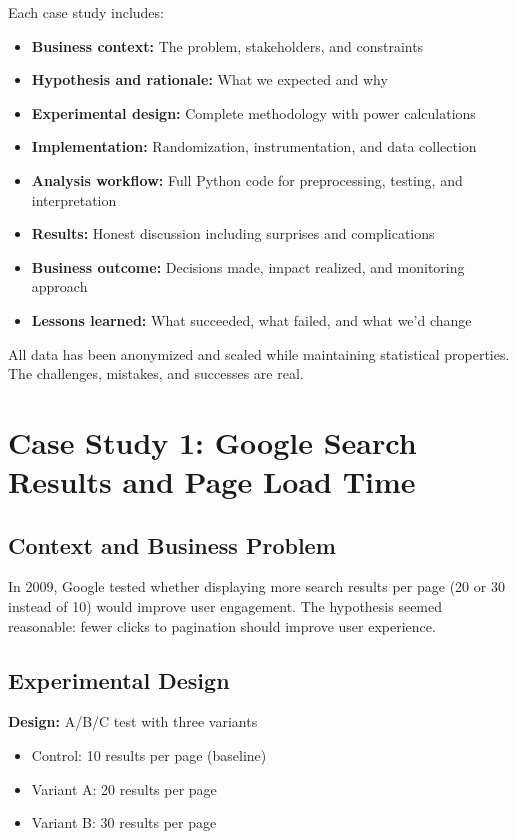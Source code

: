 Each case study includes:
\begin{itemize}
    \item \textbf{Business context:} The problem, stakeholders, and constraints
    \item \textbf{Hypothesis and rationale:} What we expected and why
    \item \textbf{Experimental design:} Complete methodology with power calculations
    \item \textbf{Implementation:} Randomization, instrumentation, and data collection
    \item \textbf{Analysis workflow:} Full Python code for preprocessing, testing, and interpretation
    \item \textbf{Results:} Honest discussion including surprises and complications
    \item \textbf{Business outcome:} Decisions made, impact realized, and monitoring approach
    \item \textbf{Lessons learned:} What succeeded, what failed, and what we'd change
\end{itemize}

All data has been anonymized and scaled while maintaining statistical properties. The challenges, mistakes, and successes are real.

\section{Case Study 1: Google Search Results and Page Load Time}

\subsection{Context and Business Problem}

In 2009, Google tested whether displaying more search results per page (20 or 30 instead of 10) would improve user engagement. The hypothesis seemed reasonable: fewer clicks to pagination should improve user experience.

\subsection{Experimental Design}

\textbf{Design:} A/B/C test with three variants
\begin{itemize}
    \item Control: 10 results per page (baseline)
    \item Variant A: 20 results per page
    \item Variant B: 30 results per page
\end{itemize}

